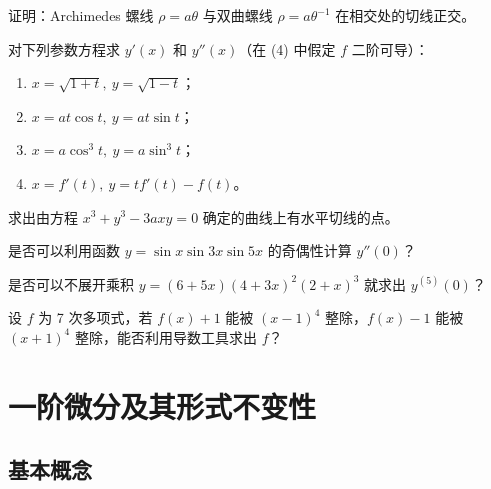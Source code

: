 \begin{xexercise}[9]
证明：Archimedes 螺线 $\rho=a\theta$ 与双曲螺线 $\rho=a\theta^{-1}$ 在相交处的切线正交。
\end{xexercise}

\begin{xexercise}[10]
对下列参数方程求 $y'(x)$ 和 $y''(x)$（在 (4) 中假定 $f$ 二阶可导）：
  \begin{enumerate}[label=(\arabic*)]
    \item $x=\sqrt{1+t},\ y=\sqrt{1-t}$；
    \item $x=at\cos t,\ y=at\sin t$；
    \item $x=a\cos^3t,\ y=a\sin^3t$；
    \item $x=f'(t),\ y=tf'(t)-f(t)$。
  \end{enumerate}
\end{xexercise}

\begin{xexercise}[11]
求出由方程 $x^3+y^3-3axy=0$ 确定的曲线上有水平切线的点。
\end{xexercise}

\begin{xexercise}[12]
是否可以利用函数 $y=\sin x\sin3x\sin5x$ 的奇偶性计算 $y''(0)$？
\end{xexercise}

\begin{xexercise}[13]
是否可以不展开乘积 $y=(6+5x)(4+3x)^2(2+x)^3$ 就求出 $y^{(5)}(0)$？
\end{xexercise}

\begin{xexercise}[14]
设 $f$ 为 7 次多项式，若 $f(x)+1$ 能被 $(x-1)^4$ 整除，$f(x)-1$ 能被 $(x+1)^4$ 整除，能否利用导数工具求出 $f$？
\end{xexercise}


\section{一阶微分及其形式不变性}

\subsection{基本概念}

